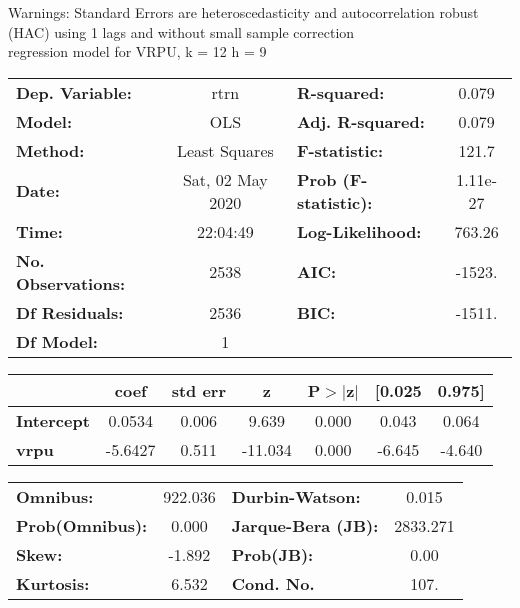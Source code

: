 Warnings: \newline
 [1] Standard Errors are heteroscedasticity and autocorrelation robust (HAC) using 1 lags and without small sample correction\\ 

regression model for VRPU, k = 12 h = 9\begin{center}
\begin{tabular}{lclc}
\toprule
\textbf{Dep. Variable:}    &       rtrn       & \textbf{  R-squared:         } &     0.079   \\
\textbf{Model:}            &       OLS        & \textbf{  Adj. R-squared:    } &     0.079   \\
\textbf{Method:}           &  Least Squares   & \textbf{  F-statistic:       } &     121.7   \\
\textbf{Date:}             & Sat, 02 May 2020 & \textbf{  Prob (F-statistic):} &  1.11e-27   \\
\textbf{Time:}             &     22:04:49     & \textbf{  Log-Likelihood:    } &    763.26   \\
\textbf{No. Observations:} &        2538      & \textbf{  AIC:               } &    -1523.   \\
\textbf{Df Residuals:}     &        2536      & \textbf{  BIC:               } &    -1511.   \\
\textbf{Df Model:}         &           1      & \textbf{                     } &             \\
\bottomrule
\end{tabular}
\begin{tabular}{lcccccc}
                   & \textbf{coef} & \textbf{std err} & \textbf{z} & \textbf{P$> |$z$|$} & \textbf{[0.025} & \textbf{0.975]}  \\
\midrule
\textbf{Intercept} &       0.0534  &        0.006     &     9.639  &         0.000        &        0.043    &        0.064     \\
\textbf{vrpu}      &      -5.6427  &        0.511     &   -11.034  &         0.000        &       -6.645    &       -4.640     \\
\bottomrule
\end{tabular}
\begin{tabular}{lclc}
\textbf{Omnibus:}       & 922.036 & \textbf{  Durbin-Watson:     } &    0.015  \\
\textbf{Prob(Omnibus):} &   0.000 & \textbf{  Jarque-Bera (JB):  } & 2833.271  \\
\textbf{Skew:}          &  -1.892 & \textbf{  Prob(JB):          } &     0.00  \\
\textbf{Kurtosis:}      &   6.532 & \textbf{  Cond. No.          } &     107.  \\
\bottomrule
\end{tabular}
\end{center}

